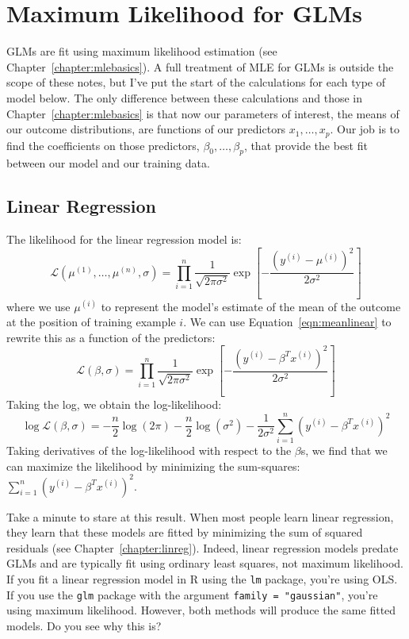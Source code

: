 
\section{Maximum Likelihood for GLMs \label{section:mleglms}}

GLMs are fit using maximum likelihood estimation (see Chapter~\ref{chapter:mlebasics}). A full treatment of MLE for GLMs is outside the scope of these notes, but I've put the start of the calculations for each type of model below. The only difference between these calculations and those in Chapter~\ref{chapter:mlebasics} is that now our parameters of interest, the means of our outcome distributions, are functions of our predictors $x_1, \dots, x_p$. Our job is to find the coefficients on those predictors, $\beta_0, \dots, \beta_p$, that provide the best fit between our model and our training data.

\subsection{Linear Regression} 

The likelihood for the linear regression model is:
$$ \mathcal{L}(\mu^{(1)}, \dots, \mu^{(n)}, \sigma) = \prod_{i=1}^n \frac{1}{\sqrt{2 \pi \sigma^2}} \exp \left[ - \frac{(y^{(i)} - \mu^{(i)})^2}{2 \sigma^2} \right] $$
where we use $\mu^{(i)}$ to represent the model's estimate of the mean of the outcome at the position of training example $i$. We can use Equation~\ref{eqn:meanlinear} to rewrite this as a function of the predictors:
$$ \mathcal{L}(\beta, \sigma) = \prod_{i=1}^n \frac{1}{\sqrt{2 \pi \sigma^2}} \exp \left[ - \frac{(y^{(i)} - \beta^T x^{(i)})^2}{2 \sigma^2} \right] $$
Taking the log, we obtain the log-likelihood:
$$ \log \mathcal{L}(\beta, \sigma) = -\frac{n}{2} \log (2 \pi) - \frac{n}{2} \log(\sigma^2) - \frac{1}{2 \sigma^2} \sum_{i=1}^n \left( y^{(i)} - \beta^T x^{(i)} \right)^2 $$
Taking derivatives of the log-likelihood with respect to the $\beta$s, we find that we can maximize the likelihood by minimizing the sum-squares: $\sum_{i=1}^n \left( y^{(i)} - \beta^T x^{(i)} \right)^2$.

\vspace{3mm}

\begin{question}{}
Take a minute to stare at this result. When most people learn linear regression, they learn that these models are fitted by minimizing the sum of squared residuals (see Chapter~\ref{chapter:linreg}). Indeed, linear regression models predate GLMs and are typically fit using ordinary least squares, not maximum likelihood. If you fit a linear regression model in R using the \texttt{lm} package, you're using OLS. If you use the \texttt{glm} package with the argument \texttt{family = "gaussian"}, you're using maximum likelihood. However, both methods will produce the same fitted models. Do you see why this is?
\end{question}

